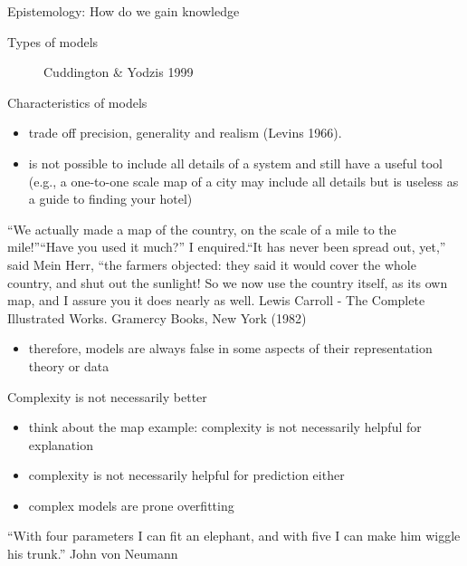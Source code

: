 \documentclass[
  ignorenonframetext,
]{beamer}
\providecommand{\tightlist}{%
  \setlength{\itemsep}{0pt}\setlength{\parskip}{0pt}}
\begin{document}
\begin{frame}{Epistemology: How do we gain knowledge}
\begin{block}{Types of models}
\begin{figure}
\caption{Cuddington & Yodzis 1999}\label{fig:p2}
\end{figure}
\end{block}

\begin{block}{Characteristics of models}
\protect\hypertarget{characteristics-of-models}{}
\begin{itemize}
\tightlist
\item
  trade off precision, generality and realism (Levins 1966).
\item
  is not possible to include all details of a system and still have a
  useful tool (e.g., a one-to-one scale map of a city may include all
  details but is useless as a guide to finding your hotel)
\end{itemize}

``We actually made a map of the country, on the scale of a mile to the
mile!''``Have you used it much?'' I enquired.``It has never been spread
out, yet,'' said Mein Herr, ``the farmers objected: they said it would
cover the whole country, and shut out the sunlight! So we now use the
country itself, as its own map, and I assure you it does nearly as well.
Lewis Carroll - The Complete Illustrated Works. Gramercy Books, New York
(1982)

\begin{itemize}
\tightlist
\item
  therefore, models are always false in some aspects of their
  representation theory or data
\end{itemize}
\end{block}

\begin{block}{Complexity is not necessarily better}
\protect\hypertarget{complexity-is-not-necessarily-better}{}
\begin{itemize}
\tightlist
\item
  think about the map example: complexity is not necessarily helpful for
  explanation
\item
  complexity is not necessarily helpful for prediction either
\end{itemize}

\begin{itemize}
\tightlist
\item
  complex models are prone overfitting
\end{itemize}

``With four parameters I can fit an elephant, and with five I can make
him wiggle his trunk.'' John von Neumann


\end{block}
\end{frame}
\end{document}
